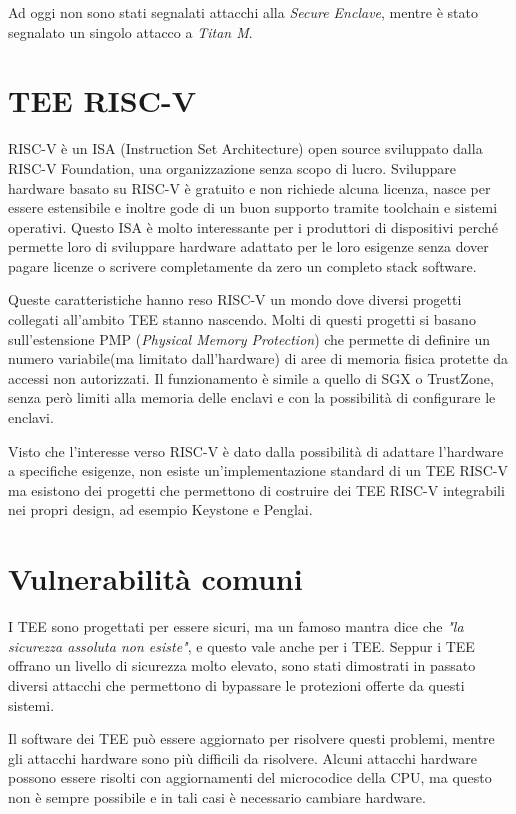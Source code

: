 \documentclass[12pt,italian]{report}
\begin{document}
\bigbreak \noindent

Ad oggi non sono stati segnalati attacchi alla \textit{Secure Enclave},
mentre è stato segnalato un singolo attacco\cite{attack_titanM} a
\textit{Titan M}.

\section{TEE RISC-V}
\label{sec:risc-v}
RISC-V è un ISA (Instruction Set Architecture) open source sviluppato
dalla RISC-V Foundation, una organizzazione senza scopo di lucro.
Sviluppare hardware basato su RISC-V è gratuito e non richiede alcuna
licenza, nasce per essere estensibile e inoltre gode di un buon supporto
tramite toolchain e sistemi operativi.
Questo ISA è molto interessante per i produttori di dispositivi perché
permette loro di sviluppare hardware adattato per le loro esigenze
senza dover pagare licenze o scrivere completamente da zero un
completo stack software.

Queste caratteristiche hanno reso RISC-V un mondo dove diversi progetti
collegati all'ambito TEE stanno nascendo.
Molti di questi progetti si basano sull'estensione
PMP (\textit{Physical Memory Protection}) che permette di definire un
numero variabile(ma limitato dall'hardware) di aree di memoria fisica
protette da accessi non autorizzati.
Il funzionamento è simile a quello di SGX o TrustZone, senza però limiti
alla memoria delle enclavi e con la possibilità di configurare le enclavi.

Visto che l'interesse verso RISC-V è dato dalla possibilità di adattare
l'hardware a specifiche esigenze, non esiste un'implementazione standard
di un TEE RISC-V ma esistono dei progetti che permettono di costruire
dei TEE RISC-V integrabili nei propri design,
ad esempio Keystone\cite{keystone} e Penglai\cite{penglai}.

\section{Vulnerabilità comuni}
\label{sec:vulnerabilita-comuni}
I TEE sono progettati per essere sicuri, ma un famoso mantra dice che
\textit{"la sicurezza assoluta non esiste"}, e questo vale anche per i TEE.
Seppur i TEE offrano un livello di sicurezza molto elevato, sono stati
dimostrati in passato diversi attacchi che permettono di bypassare
le protezioni offerte da questi sistemi.

Il software dei TEE può essere aggiornato per risolvere questi problemi,
mentre gli attacchi hardware sono più difficili da risolvere.
Alcuni attacchi hardware possono essere risolti con aggiornamenti del
microcodice della CPU, ma questo non è sempre possibile e in tali casi
è necessario cambiare hardware. 
\end{document}
